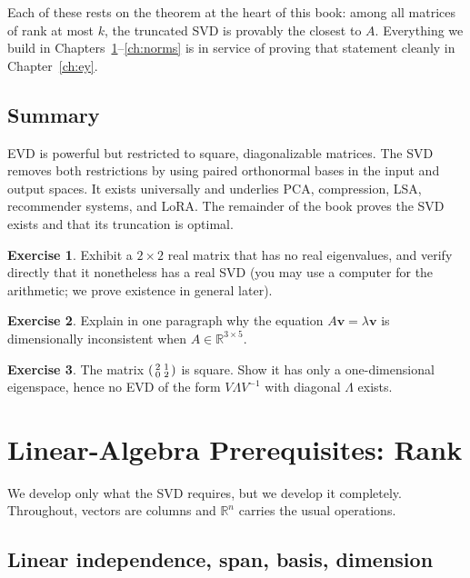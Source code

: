 \documentclass[11pt,oneside]{book}
\theoremstyle{plain}
\theoremstyle{definition}
\newtheorem{exercise}{Exercise}[chapter]
\theoremstyle{remark}
\newcommand{\R}{\mathbb{R}}
\newcommand{\inv}{^{-1}}
\newcommand{\bv}{\mathbf{v}}
\begin{document}
Each of these rests on the theorem at the heart of this book: among all matrices of
rank at most $k$, the truncated SVD is provably the closest to $A$. Everything we build
in Chapters~\ref{ch:rank}--\ref{ch:norms} is in service of proving that statement
cleanly in Chapter~\ref{ch:ey}.

\section*{Summary}
EVD is powerful but restricted to square, diagonalizable matrices. The SVD removes both
restrictions by using paired orthonormal bases in the input and output spaces. It exists
universally and underlies PCA, compression, LSA, recommender systems, and LoRA. The
remainder of the book proves the SVD exists and that its truncation is optimal.

\begin{exercise}
Exhibit a $2\times2$ real matrix that has no real eigenvalues, and verify directly that
it nonetheless has a real SVD (you may use a computer for the arithmetic; we prove
existence in general later).
\end{exercise}
\begin{exercise}
Explain in one paragraph why the equation $A\bv=\lambda\bv$ is dimensionally
inconsistent when $A\in\R^{3\times 5}$.
\end{exercise}
\begin{exercise}
The matrix $\begin{psmallmatrix}2&1\\0&2\end{psmallmatrix}$ is square. Show it has only a
one-dimensional eigenspace, hence no EVD of the form $V\Lambda V\inv$ with diagonal
$\Lambda$ exists.
\end{exercise}

\chapter{Linear-Algebra Prerequisites: Rank}\label{ch:rank}

We develop only what the SVD requires, but we develop it completely. Throughout,
vectors are columns and $\R^n$ carries the usual operations.

\section{Linear independence, span, basis, dimension}
\end{document}
